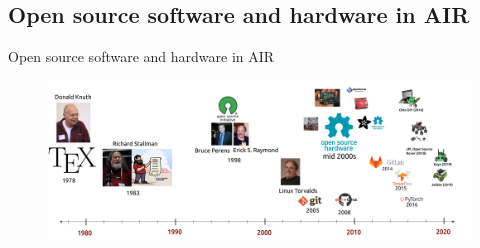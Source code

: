 \subsection{Open source software and hardware in AIR}

{
\begin{frame}{Open source software and hardware in AIR}

      \begin{figure}
        \centering
        \includegraphics[width=1.0\textwidth]{./figures/timeline-osh/outputs/drawing-v00.png}
      \end{figure}
\end{frame}
}

